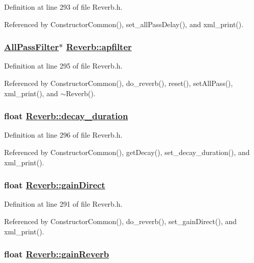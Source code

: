 Definition at line 293 of file Reverb.h.

Referenced by Constructor\-Common(), set\_\-all\-Pass\-Delay(), and xml\_\-print().\hypertarget{classReverb_r4}{
\subsubsection[apfilter]{\setlength{\rightskip}{0pt plus 5cm}\hyperlink{classAllPassFilter}{All\-Pass\-Filter}$\ast$ \hyperlink{classReverb_r4}{Reverb::apfilter}}}
\label{classReverb_r4}




Definition at line 295 of file Reverb.h.

Referenced by Constructor\-Common(), do\_\-reverb(), reset(), set\-All\-Pass(), xml\_\-print(), and $\sim$Reverb().\hypertarget{classReverb_r5}{
\subsubsection[decay\_\-duration]{\setlength{\rightskip}{0pt plus 5cm}float \hyperlink{classReverb_r5}{Reverb::decay\_\-duration}}}
\label{classReverb_r5}




Definition at line 296 of file Reverb.h.

Referenced by Constructor\-Common(), get\-Decay(), set\_\-decay\_\-duration(), and xml\_\-print().\hypertarget{classReverb_r0}{
\subsubsection[gainDirect]{\setlength{\rightskip}{0pt plus 5cm}float \hyperlink{classReverb_r0}{Reverb::gain\-Direct}}}
\label{classReverb_r0}




Definition at line 291 of file Reverb.h.

Referenced by Constructor\-Common(), do\_\-reverb(), set\_\-gain\-Direct(), and xml\_\-print().\hypertarget{classReverb_r1}{
\subsubsection[gainReverb]{\setlength{\rightskip}{0pt plus 5cm}float \hyperlink{classReverb_r1}{Reverb::gain\-Reverb}}}
\label{classReverb_r1}




